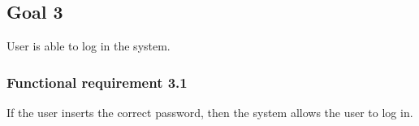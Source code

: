 \subsection{Goal 3}
User is able to log in the system.

\setcounter{secnumdepth}{3}
\subsubsection{Functional requirement 3.1}
If the user inserts the correct password, then the system allows the user to log in.
